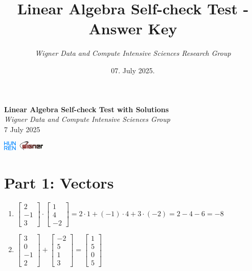 \documentclass{article}
\title{Linear Algebra Self-check Test - Answer Key}
\date{07. July 2025.}
\author{\textit{Wigner Data and Compute Intensive Sciences Research Group}}
\begin{document}
\begin{minipage}{0.8\textwidth}
	\centering
	{\Large\textbf{Linear Algebra Self-check Test with Solutions}\\ \textit{Wigner Data and Compute Intensive Sciences Group}}\\
	\vspace*{0.25cm}
	{\normalsize 7 July 2025}
\end{minipage}
\begin{minipage}{0.2\textwidth}
	\includegraphics[width=2cm]{img/logo.png}
\end{minipage}

\vspace{0.75cm}

\section*{Part 1: Vectors}
\begin{enumerate}
\item $\begin{bmatrix} 2 \\ -1 \\ 3 \end{bmatrix} \cdot \begin{bmatrix} 1 \\ 4 \\ -2 \end{bmatrix} = \boxed{2\cdot1 + (-1)\cdot4 + 3\cdot(-2) = 2 - 4 - 6 = -8}$

\item $\begin{bmatrix} 3 \\ 0 \\ -1 \\ 2 \end{bmatrix} + \begin{bmatrix} -2 \\ 5 \\ 1 \\ 3 \end{bmatrix} = \boxed{\begin{bmatrix} 1 \\ 5 \\ 0 \\ 5 \end{bmatrix}}$ \\ 
\end{enumerate}
\end{document}
